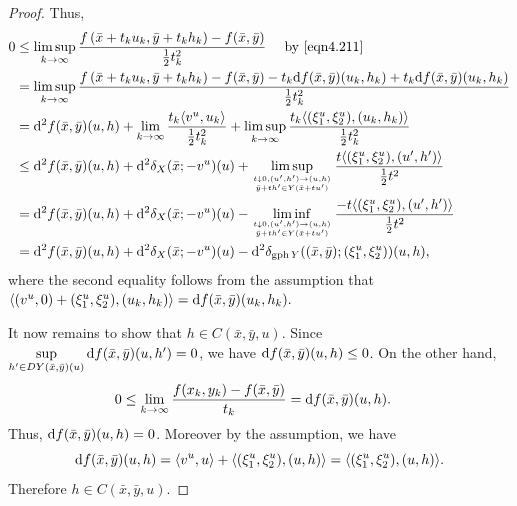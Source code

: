 \documentclass[11pt]{article}
\numberwithin{equation}{section}
\begin{document}
{\begin{proof}
Thus,
\begin{eqnarray*}\label{}
\begin{aligned}
0 & \leq \limsup\limits_{k \to \infty} \frac{f\left(\bar{x}+t_k u_k, \bar{y}+t_kh_k\right)-f(\bar{x}, \bar{y})}{\frac{1}{2}t_k^2} \quad \mbox{ by } \eqref{eqn4.211}\\
& =\limsup\limits_{k \to \infty} \frac{f\left(\bar{x}+t_k u_k, \bar{y}+t_kh_k\right)-f(\bar{x}, \bar{y})-t_k{\rm d}f(\bar{x}, \bar{y})(u_k,h_k)+t_k{\rm d}f(\bar{x}, \bar{y})(u_k,h_k)}{\frac{1}{2}t_k^2}  \\
& = {\rm d}^2 f(\bar x,\bar y)(u,h) + \lim\limits_{k \to \infty} \frac{t_k \langle v^u,u_k \rangle}{\frac{1}{2}t_k^2} + \limsup\limits_{k \to \infty} \frac{t_k \langle (\xi_1^u,\xi_2^u),(u_k,h_k) \rangle}{\frac{1}{2}t_k^2} \\
& \leq {\rm d}^2 f(\bar x,\bar y)(u,h) + {\rm d}^2 \delta_X(\bar x;-v^u)(u) + \limsup\limits_{{t \downarrow 0,(u',h') \to (u,h)} \atop {\bar y+th'\in Y(\bar x+tu')}} \frac{t \langle (\xi_1^u,\xi_2^u),(u',h') \rangle}{\frac{1}{2}t^2} \\
& = {\rm d}^2 f(\bar x,\bar y)(u,h) + {\rm d}^2 \delta_X(\bar x;-v^u)(u) - \liminf\limits_{{t \downarrow 0,(u',h') \to (u,h)} \atop {\bar y+th'\in Y(\bar x+tu')}} \frac{-t \langle (\xi_1^u,\xi_2^u),(u',h') \rangle}{\frac{1}{2}t^2} \\
& = {\rm d}^2 f(\bar x,\bar y)(u,h) + {\rm d}^2 \delta_X(\bar x;-v^u)(u) -{\rm d}^2 \delta_{\operatorname{gph}Y}((\bar x,\bar y);(\xi_1^u,\xi_2^u))(u,h),
\end{aligned}
\end{eqnarray*}
where the second equality follows from the assumption that
$\langle (v^u,0)+(\xi_1^u,\xi_2^u), (u_k,h_k) \rangle = {\rm d} f(\bar x,\bar y)(u_k,h_k).$

It now remains to show that $h\in C(\bar x,\bar y,u)$. Since   $\sup\limits_{h' \in D Y(\bar x,\bar y)(u)} {\rm d} f(\bar x,\bar y)(u,h') = 0$, we have ${\rm d} f(\bar x,\bar y)(u,h) \leq 0$. On the other hand,
\begin{eqnarray*}\label{}
\begin{aligned}
0  & \leq  \lim\limits_{k \to \infty} \frac{f(x_k,y_k)-f(\bar x,\bar y)}{t_k} = {\rm d} f(\bar x,\bar y)(u,h).
\end{aligned}
\end{eqnarray*}
Thus, ${\rm d} f(\bar x,\bar y)(u,h) = 0$. Moreover by the assumption, we have
$${\rm d} f(\bar x,\bar y)(u,h)=\langle v^u, u\rangle +\langle (\xi_1^u,\xi_2^u),(u,h) \rangle=\langle (\xi_1^u,\xi_2^u),(u,h) \rangle.$$
Therefore $h\in C(\bar x,\bar y,u)$.


\end{proof}}
\end{document}
